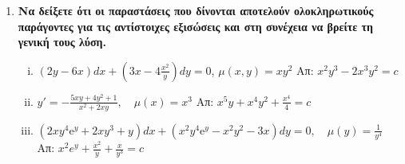 \begin{enumerate}
  \item {\bfseries Να δείξετε ότι οι παραστάσεις που δίνονται αποτελούν ολοκληρωτικούς 
      παράγοντες για τις αντίστοιχες εξισώσεις και στη συνέχεια να βρείτε τη γενική 
    τους λύση.}
    \begin{enumerate}[i)]
      \item $ (2y-6x)dx+\left(3x-4\frac{x^{2}}{y}\right)dy=0 $, \; $ \mu (x,y) = 
        xy^{2} $
        \hfill Απ: $ x^{2}y^{3}-2x^{3}y^{2}=c $ %
      \item $ y' =- \frac{5xy+4y^{2}+1}{x^{2}+2xy}, \quad \mu(x)=x^{3} $  
        \hfill Απ: $ x^{5}y+x^{4}y^{2} + \frac{x^{4}}{4} = c $ 
      \item $ (2xy^{4} \mathrm{e}^{y} + 2xy^{3}+y)dx + (x^{2}y^{4}\mathrm{e}^{y} -
        x^{2}y^{2}-3x)dy=0, \quad \mu (y) = \frac{1}{y^{4}} $ 
        \hfill Απ: $ x^{2}e^{y}+ \frac{x^{2}}{y} + \frac{x}{y^{3}} =c $ 
    \end{enumerate}
\end{enumerate}




